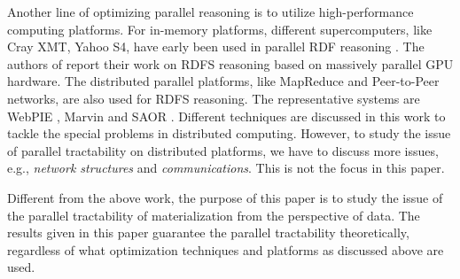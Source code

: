 Another line of optimizing parallel reasoning is to utilize high-performance computing platforms. For in-memory platforms, different supercomputers, like Cray XMT, Yahoo S4, have early been used in parallel RDF reasoning \cite{Hoeksema2011,GoodmanJMAAH11}. The authors of \cite{HeinoP12} report their work on RDFS reasoning based on massively parallel GPU hardware. The distributed parallel platforms, like MapReduce and Peer-to-Peer networks, are also used for RDFS reasoning. The representative systems are WebPIE \cite{UrbaniKMHB12}, Marvin \cite{oren2009marvin} and SAOR \cite{HoganHP09}. Different techniques are discussed in this work to tackle the special problems in distributed computing. However, to study the issue of parallel tractability on distributed platforms, we have to discuss more issues, e.g., \emph{network structures} and \emph{communications}. This is not the focus in this paper.

Different from the above work, the purpose of this paper is to study the issue of the parallel tractability of materialization from the perspective of data. The results given in this paper guarantee the parallel tractability theoretically, regardless of what optimization techniques and platforms as discussed above are used.




